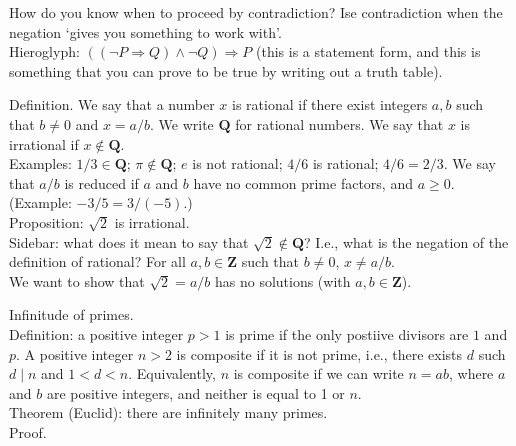 \documentclass[12pt]{article}
\begin{document}
How do you know when to proceed by contradiction? Ise contradiction when the negation `gives you something to work with'.
\\

Hieroglyph: $((\neg P \Rightarrow Q) \wedge \neg Q) \Rightarrow P$ (this is a statement form, and this is something that you can prove to be true by writing out a truth table).


\newpage

Definition. We say that a number $x$ is rational if there exist integers $a,b$ such that $b \neq 0$ and $x = a/b$. We write $\mathbf{Q}$ for rational numbers. We say that $x$ is irrational if $x \not \in \mathbf{Q}$.
\\

Examples: $1/3 \in \mathbf{Q}$; $\pi \not \in \mathbf{Q}$; $e$ is not rational; $4/6$ is rational; $4/6 = 2/3$. We say that $a/b$ is reduced if $a$ and $b$ have no common prime factors, and $a \geq 0$. (Example: $-3/5 = 3/(-5)$.) 
\\ 

Proposition: $\sqrt{2}$ is irrational.
\\

Sidebar: what does it mean to say that $\sqrt{2} \not \in \mathbf{Q}$? I.e., what is the negation of the definition of rational? For all $a,b \in \mathbf{Z}$ such that $b \neq 0$, $x \neq a/b$.
\\

We want to show that $\sqrt{2} = a/b$ has no solutions (with $a,b \in \mathbf{Z}$).

\newpage

Infinitude of primes. 
\\

Definition: a positive integer $p> 1$ is prime if the only postiive divisors are $1$ and $p$. A positive integer $n > 2$ is composite if it is not prime, i.e., there exists $d$ such $d \mid n$ and $1 < d < n$. Equivalently, $n$ is composite if we can write $n = ab$, where $a$ and $b$ are positive integers, and neither is equal to 1 or $n$.
\\

Theorem (Euclid): there are infinitely many primes. 
\\

Proof. 
\end{document}
